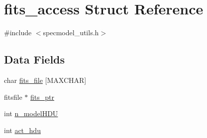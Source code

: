 \hypertarget{structfits__access}{
\section{fits\_\-access Struct Reference}
\label{structfits__access}
}


{\ttfamily \#include $<$specmodel\_\-utils.h$>$}\subsection*{Data Fields}
\begin{DoxyCompactItemize}
\item 
char \hyperlink{structfits__access_af606a81f066e75230aa061386ddede21}{fits\_\-file} \mbox{[}MAXCHAR\mbox{]}
\item 
fitsfile $\ast$ \hyperlink{structfits__access_afdf355de50df0d99e3186ad2fddcd2b6}{fits\_\-ptr}
\item 
int \hyperlink{structfits__access_a241260b89300c1d0fa1356f279c1319c}{n\_\-modelHDU}
\item 
int \hyperlink{structfits__access_a210b0f35b33c7e271b3d288d05782dbf}{act\_\-hdu}
\end{DoxyCompactItemize}


